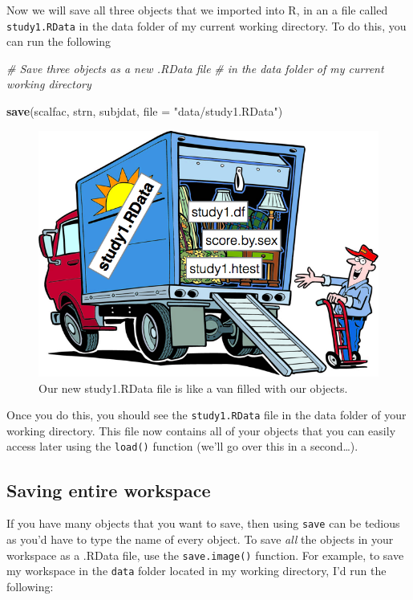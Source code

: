 \documentclass[
]{book}
\newenvironment{Shaded}{\begin{snugshade}}{\end{snugshade}}
\newcommand{\CommentTok}[1]{\textcolor[rgb]{0.56,0.35,0.01}{\textit{#1}}}
\newcommand{\DataTypeTok}[1]{\textcolor[rgb]{0.13,0.29,0.53}{#1}}
\newcommand{\KeywordTok}[1]{\textcolor[rgb]{0.13,0.29,0.53}{\textbf{#1}}}
\newcommand{\NormalTok}[1]{#1}
\newcommand{\StringTok}[1]{\textcolor[rgb]{0.31,0.60,0.02}{#1}}
\begin{document}
Now we will save all three objects that we imported into R, in an a file called \texttt{study1.RData} in the data folder of my current working directory. To do this, you can run the following

\begin{Shaded}
\begin{Highlighting}[]
\CommentTok{# Save three objects as a new .RData file}
\CommentTok{#   in the data folder of my current working directory}

\KeywordTok{save}\NormalTok{(scalfac, }
\NormalTok{     strn, }
\NormalTok{     subjdat,}
     \DataTypeTok{file =} \StringTok{"data/study1.RData"}\NormalTok{)}
\end{Highlighting}
\end{Shaded}

\begin{figure}

{\centering \includegraphics[width=0.75\linewidth]{images/rdatavan} 

}

\caption{Our new study1.RData file is like a van filled with our objects.}\label{fig:rdatavan}
\end{figure}

Once you do this, you should see the \texttt{study1.RData} file in the data folder of your working directory. This file now contains all of your objects that you can easily access later using the \texttt{load()} function (we'll go over this in a second\ldots).

\hypertarget{saving-entire-workspace}{%
\subsection{Saving entire workspace}\label{saving-entire-workspace}}

If you have many objects that you want to save, then using \texttt{save} can be tedious as you'd have to type the name of every object. To save \emph{all} the objects in your workspace as a .RData file, use the \texttt{save.image()} function. For example, to save my workspace in the \texttt{data} folder located in my working directory, I'd run the following:
\end{document}
